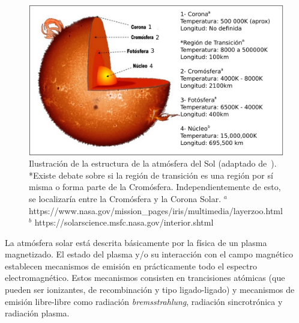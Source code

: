 \documentclass[9pt]{book}
\begin{document}
\begin{figure}[h]
\centering
\includegraphics[scale=.5]{atmosfera}
\caption{Ilustraci\'on de la estructura de la atm\'osfera del Sol (adaptado de~\cite{1979NASSP.402.....E}). \newline
*Existe debate sobre si la regi\'on de transici\'on es una regi\'on por s\'i misma o forma parte de la Crom\'osfera. Independientemente de esto, se localizar\'ia entre la Crom\'osfera y la Corona Solar. \newline
$^{a}$ https://www.nasa.gov/mission\_pages/iris/multimedia/layerzoo.html \newline
$^{b}$ https://solarscience.msfc.nasa.gov/interior.shtml}
\label{atmosfera_solar}
\end{figure}

La atm\'osfera solar est\'a descrita b\'asicamente por la f\'isica de un plasma magnetizado. El estado del plasma y/o su interacci\'on con el campo magn\'etico establecen mecanismos de emisi\'on en pr\'acticamente todo el espectro electromagn\'etico. Estos mecanismos consisten en trancisiones at\'omicas (que pueden ser ionizantes, de recombinaci\'on y tipo ligado-ligado) y mecanismos de emisi\'on libre-libre como radiaci\'on \emph{bremsstrahlung}, radiaci\'on sincrotr\'onica y radiaci\'on plasma.
\end{document}
